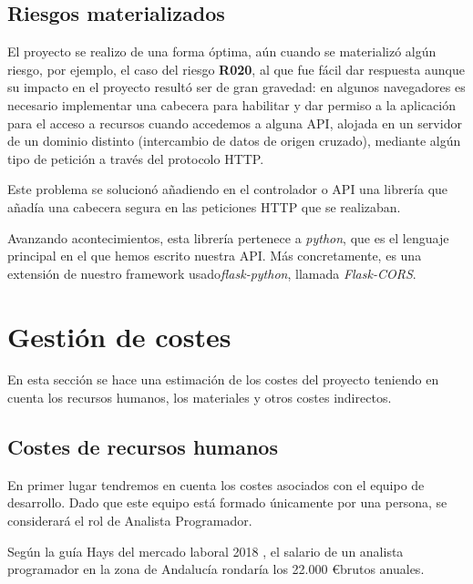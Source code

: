 \subsection{Riesgos materializados}

El proyecto se realizo de una forma óptima, aún cuando se materializó algún riesgo, por ejemplo, el caso del riesgo \textbf{R020}, al que fue fácil dar respuesta aunque su impacto en el proyecto resultó ser de gran gravedad: en algunos navegadores es necesario implementar una cabecera para habilitar y dar permiso a la aplicación para el acceso a recursos cuando accedemos a alguna API, alojada en un servidor de un dominio distinto (intercambio de datos de origen cruzado), mediante algún tipo de petición a través del protocolo HTTP\cite{cors}.

Este problema se solucionó añadiendo en el controlador o API una librería que añadía una cabecera segura en las peticiones HTTP que se realizaban\cite{corsflask}.

Avanzando acontecimientos, esta librería pertenece a \textit{python}, que es el lenguaje principal en el que hemos escrito nuestra API. Más concretamente, es una extensión de nuestro framework usado\textit{flask-python}, llamada \textit{Flask-CORS}\cite{corsflask2}.

\section{Gestión de costes}

En esta sección se hace una estimación de los costes del proyecto teniendo en cuenta los recursos humanos, los materiales y otros costes indirectos.

\subsection{Costes de recursos humanos}

En primer lugar tendremos en cuenta los costes asociados con el equipo de desarrollo. Dado que este equipo está formado únicamente por una persona, se considerará el rol de Analista Programador.

Según la guía Hays del mercado laboral 2018 \cite{guiahays}, el salario de un analista programador en la zona de Andalucía rondaría los 22.000 \euro brutos anuales.

